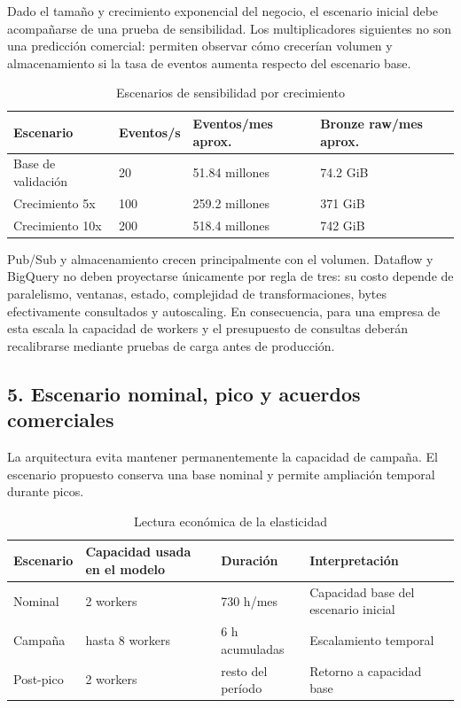 \documentclass[11pt,a4paper]{article}
\begin{document}
Dado el tamaño y crecimiento exponencial del negocio, el escenario inicial debe acompañarse de una prueba de sensibilidad. Los multiplicadores siguientes no son una predicción comercial: permiten observar cómo crecerían volumen y almacenamiento si la tasa de eventos aumenta respecto del escenario base.

\begin{table}[H]
\caption{Escenarios de sensibilidad por crecimiento}\label{tab:crecimiento-costos}
\small
\begin{tabularx}{\linewidth}{@{}P{.20\linewidth}P{.20\linewidth}P{.25\linewidth}Y@{}}\toprule
Escenario & Eventos/s & Eventos/mes aprox. & Bronze raw/mes aprox.\\\midrule
Base de validación & 20 & 51.84 millones & 74.2 GiB\\
Crecimiento 5x & 100 & 259.2 millones & 371 GiB\\
Crecimiento 10x & 200 & 518.4 millones & 742 GiB\\\bottomrule
\end{tabularx}
\end{table}

Pub/Sub y almacenamiento crecen principalmente con el volumen. Dataflow y BigQuery no deben proyectarse únicamente por regla de tres: su costo depende de paralelismo, ventanas, estado, complejidad de transformaciones, bytes efectivamente consultados y autoscaling. En consecuencia, para una empresa de esta escala la capacidad de workers y el presupuesto de consultas deberán recalibrarse mediante pruebas de carga antes de producción.

\subsection*{5. Escenario nominal, pico y acuerdos comerciales}

La arquitectura evita mantener permanentemente la capacidad de campaña. El escenario propuesto conserva una base nominal y permite ampliación temporal durante picos.

\begin{table}[H]
\caption{Lectura económica de la elasticidad}\label{tab:escenarios-costos}
\small
\begin{tabularx}{\linewidth}{@{}P{.25\linewidth}P{.23\linewidth}YY@{}}\toprule
Escenario & Capacidad usada en el modelo & Duración & Interpretación\\\midrule
Nominal & 2 workers & 730 h/mes & Capacidad base del escenario inicial\\
Campaña & hasta 8 workers & 6 h acumuladas & Escalamiento temporal\\
Post-pico & 2 workers & resto del período & Retorno a capacidad base\\\bottomrule
\end{tabularx}
\end{table}
\end{document}
